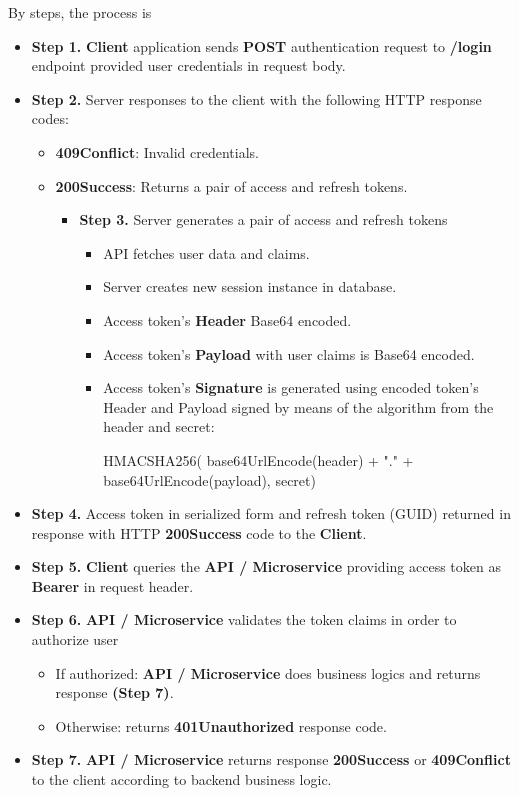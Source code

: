 By steps, the process is
\begin{itemize}
    \item \textbf{Step 1.} \textbf{Client} application sends \textbf{POST} authentication request to \textbf{/login} endpoint
    provided user credentials in request body.
    \item \textbf{Step 2.} Server responses to the client with the following HTTP response codes:
    \begin{itemize}
        \item \textbf{409Conflict}: Invalid credentials.
        \item \textbf{200Success}: Returns a pair of access and refresh tokens.
        \begin{itemize}
            \item \textbf{Step 3.} Server generates a pair of access and refresh tokens
            \begin{itemize}
                \item API fetches user data and claims.
                \item Server creates new session instance in database.
                \item Access token's \textbf{Header} Base64 encoded.
                \item Access token's \textbf{Payload} with user claims is Base64 encoded.
                \item Access token's \textbf{Signature} is generated using encoded token's Header and Payload signed by means of the
                algorithm from the header and secret:
                \begin{spverbatim}
                    HMACSHA256(
                    base64UrlEncode(header) + "." +
                    base64UrlEncode(payload),
                    secret)
                \end{spverbatim}
            \end{itemize}
        \end{itemize}
    \end{itemize}
    \item \textbf{Step 4.} Access token in serialized form and refresh token (GUID) returned in response with
    HTTP \textbf{200Success} code to the \textbf{Client}.
    \item \textbf{Step 5.} \textbf{Client} queries the \textbf{API / Microservice} providing access token as
    \textbf{Bearer} in request header.
    \item \textbf{Step 6.} \textbf{API / Microservice} validates the token claims in order to authorize user
    \begin{itemize}
        \item If authorized: \textbf{API / Microservice} does business logics and returns response \textbf{(Step 7)}.
        \item Otherwise: returns \textbf{401Unauthorized} response code.
    \end{itemize}
    \item \textbf{Step 7.} \textbf{API / Microservice} returns response \textbf{200Success} or \textbf{409Conflict}
    to the client according to backend business logic.
\end{itemize}